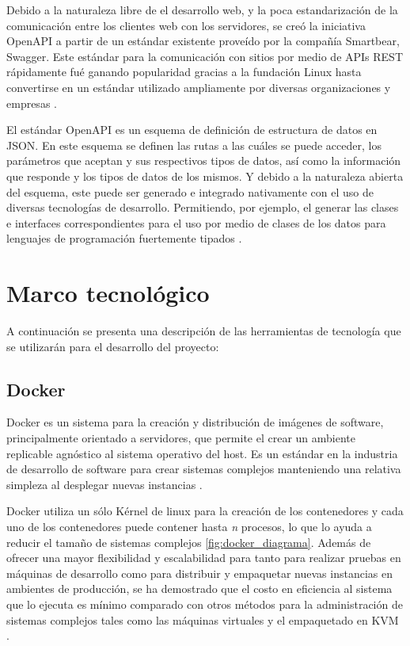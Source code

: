 Debido a la naturaleza libre de el desarrollo web, y la poca estandarización de la comunicación entre los clientes web con los servidores, se creó la iniciativa OpenAPI a partir de un estándar existente proveído por la compañía Smartbear, Swagger. Este estándar para la comunicación con sitios por medio de APIs REST rápidamente fué ganando popularidad gracias a la fundación Linux hasta convertirse en un estándar utilizado ampliamente por diversas organizaciones y empresas \cite{OpenAPI_foundation}.

El estándar OpenAPI es un esquema de definición de estructura de datos en JSON. En este esquema se definen las rutas a las cuáles se puede acceder, los parámetros que aceptan y sus respectivos tipos de datos, así como la información que responde y los tipos de datos de los mismos. Y debido a la naturaleza abierta del esquema, este puede ser generado e integrado nativamente con el uso de diversas tecnologías de desarrollo. Permitiendo, por ejemplo, el generar las clases e interfaces correspondientes para el uso por medio de clases de los datos para lenguajes de programación fuertemente tipados \cite{openapi_generator}.

\section{Marco tecnológico}



A continuación se presenta una descripción de las herramientas de tecnología que se utilizarán para el desarrollo del proyecto:

\subsection{Docker}

Docker es un sistema para la creación y distribución de imágenes de software, principalmente orientado a servidores, que permite el crear un ambiente replicable agnóstico al sistema operativo del host. Es un estándar en la industria de desarrollo de software para crear sistemas complejos manteniendo una relativa simpleza al desplegar nuevas instancias \cite{rad2017dockerAnalysis}.


Docker utiliza un sólo Kérnel de linux para la creación de los contenedores y cada uno de los contenedores puede contener hasta \textit{n} procesos, lo que lo ayuda a reducir el tamaño de sistemas complejos \ref{fig:docker_diagrama}. Además de ofrecer una mayor flexibilidad y escalabilidad para tanto para realizar pruebas en máquinas de desarrollo como para distribuir y empaquetar nuevas instancias en ambientes de producción, se ha demostrado que el costo en eficiencia al sistema que lo ejecuta es mínimo comparado con otros métodos para la administración de sistemas complejos tales como las máquinas virtuales y el empaquetado en KVM \cite{rad2017dockerAnalysis, felter2015comparsionPerformance}.


